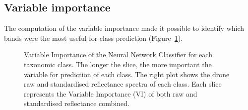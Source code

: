 \documentclass[
  letterpaper,
  11pt,
  english,
  singlespacing,
  headsepline]{MastersDoctoralThesis}
\begin{document}
\begin{spacing}{1.5}
\subsection{Variable importance}\label{variable-importance-1}

The computation of the variable importance made it possible to identify
which bands were the most useful for class prediction
(Figure~\ref{fig-VIP}).

\begin{figure}


\caption{\label{fig-VIP}Variable Importance of the Neural Network
Classifier for each taxonomic class. The longer the slice, the more
important the variable for prediction of each class. The right plot
shows the drone raw and standardised reflectance spectra of each class.
Each slice represents the Variable Importance (VI) of both raw and
standardised reflectance combined.}


\end{figure}
\end{spacing}
\end{document}
